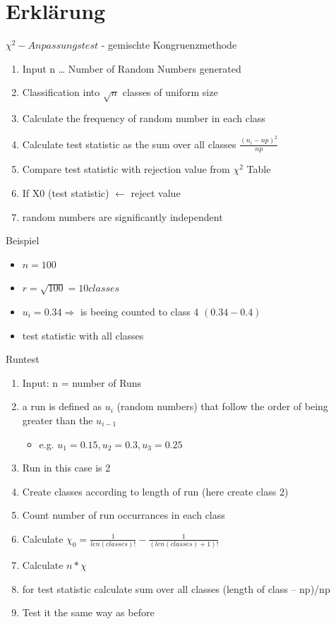 \section{Erklärung}
\begin{frame}{$\chi^2-Anpassungstest$ - gemischte Kongruenzmethode}
	\begin{enumerate}
		\item Input n … Number of Random Numbers generated
		\item Classification into $\sqrt{n}$ classes of uniform size
		\item Calculate the frequency of random number in each class
		\item Calculate test statistic as the sum over all classes $\frac{(n_i - np)^2}{np}$
		\item Compare test statistic with rejection value from $\chi^2$ Table
		\item If X0 (test statistic) $\leftarrow$ reject value 
		\item random numbers are significantly independent
	\end{enumerate}
\end{frame}

\begin{frame}{Beispiel}
	\begin{itemize}
		\item $n = 100$
		\item $r = \sqrt{100} = 10 classes$
		\item $u_i = 0.34 \Rightarrow$ is beeing counted to class 4 $(0.34 - 0.4)$
		\item test statistic with all classes
	\end{itemize}
\end{frame}

\begin{frame}{Runtest}
	\begin{enumerate}
		\item Input: n = number of Runs
		\item a run is defined as $u_i$ (random numbers) that follow the order of being greater than the $u_{i-1}$
		\begin{itemize}
			\item e.g. $u_1 = 0.15, u_2 = 0.3, u_3 = 0.25$
		\end{itemize}
		\item Run in this case is 2
		\item Create classes according to length of run (here create class 2)
		\item Count number of run occurrances in each class
		\item Calculate $\chi_0 = \frac{1}{len(classes)!} - \frac{1}{(len(classes)+1)!}$
		\item Calculate $n * \chi$
		\item for test statistic calculate sum over all classes (length of class – np)/np 
		\item Test it the same way as before
	\end{enumerate}
\end{frame}

